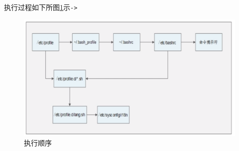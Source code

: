 \documentclass[UTF8,a4paper,12pt]{ctexbook}
\begin{document}
			执行过程如下所图\ref{env}示\verb|->|
				\begin{figure}[H]
					\centering
					\includegraphics[scale=0.3]{env.png}
					\caption{执行顺序}
					\label{env}
				\end{figure}
			
\end{document}
